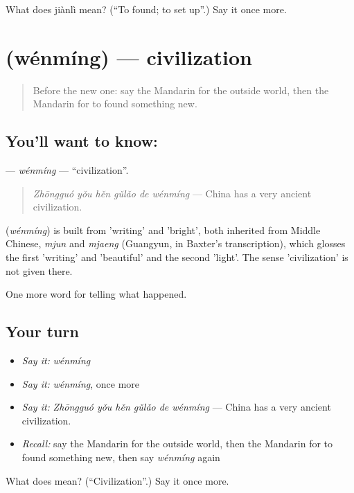 \begin{tcolorbox}[breakable,colback=teal!4,colframe=teal!35!black,title={Before you move on}]
What does jiànlì mean? (\textquotedblleft{}To found; to set up\textquotedblright{}.) Say it once more.
\end{tcolorbox}
\section[\texorpdfstring{\zh{文明} (wénmíng)}{文明 (wénmíng)}]{ (wénmíng) — civilization}

\label{lesson:ZH-C326-wenming}



\begin{quote}
Before the new one: say the Mandarin for the outside world, then the Mandarin for to found something new.
\end{quote}

\subsection*{You'll want to know: }
\textbf{} — \emph{wénmíng} — \textquotedblleft{}civilization\textquotedblright{}.

\begin{quote}
\textbf{} \emph{Zhōngguó yǒu hěn gǔlǎo de wénmíng} — China has a very ancient civilization.
\end{quote}

\begin{cousinweb}
\textbf{} (\emph{wénmíng}) is built from  'writing' and  'bright', both inherited from Middle Chinese, \emph{mjun} and \emph{mjaeng} (Guangyun, in Baxter's transcription), which glosses the first 'writing' and 'beautiful' and the second 'light'. The sense 'civilization' is not given there.
\end{cousinweb}

\begin{grammarlens}[title={What you've built}]
One more word for telling what happened.
\end{grammarlens}

\subsection*{Your turn}
\begin{itemize}
\raggedright
  \item \emph{Say it:} \emph{wénmíng}
  \item \emph{Say it:} \emph{wénmíng}, once more
  \item \emph{Say it:} \emph{Zhōngguó yǒu hěn gǔlǎo de wénmíng} — China has a very ancient civilization.
  \item \emph{Recall:} say the Mandarin for the outside world, then the Mandarin for to found something new, then say \emph{wénmíng} again
\end{itemize}

\begin{tcolorbox}[breakable,colback=teal!4,colframe=teal!35!black,title={Before you move on}]
What does  mean? (\textquotedblleft{}Civilization\textquotedblright{}.) Say it once more.
\end{tcolorbox}
